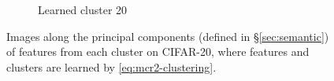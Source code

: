 \documentclass[10pt,twocolumn,letterpaper]{article}
\begin{document}
\begin{figure}
\begin{subfigure}{0.32\textwidth}
       \caption{Learned cluster 20}
     \end{subfigure}
     \caption{Images along the principal components (defined in \S \ref{sec:semantic}) of features from each cluster on CIFAR-20, where features and clusters are learned by \eqref{eq:mcr2-clustering}.}
     \label{fig:cifar100-20-pc}
   \end{figure}
   
\end{document}
